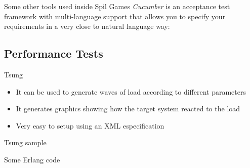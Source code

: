\documentclass[pdf]{beamer}
\begin{document}
\begin{frame}{Some other tools used inside Spil Games}
    \emph{Cucumber} is an acceptance test framework with multi-language support that allows you to specify your
    requirements in a very close to natural language way:
\end{frame}

\subsection*{Performance Tests}
\label{performance_tests}

\begin{frame}{Tsung}
    \begin{itemize}
    \item It can be used to generate waves of load according to different parameters
    \item It generates graphics showing how the target system reacted to the load
    \item Very easy to setup using an XML especification
    \end{itemize}
\end{frame}

\begin{frame}{Tsung sample}
\end{frame}






\begin{frame}{Some Erlang code}
    
\end{frame}
\end{document}
